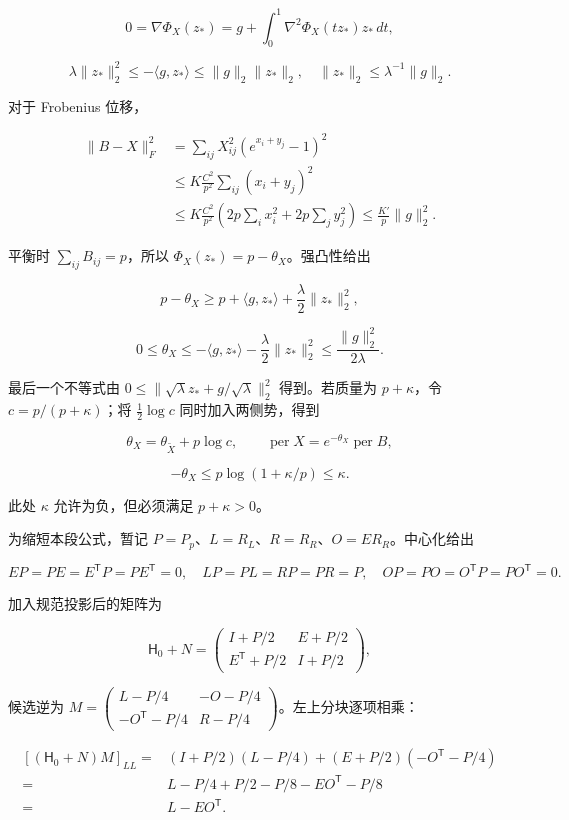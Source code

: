 \documentclass[11pt,a4paper]{article}
\begin{document}
\[
0=\nabla\Phi_X(z_*)=g+\int_0^1\nabla^2\Phi_X(tz_*)z_*\,dt,
\]

\[
\lambda\|z_*\|_2^2\le-\langle g,z_*\rangle\le\|g\|_2\|z_*\|_2,
\quad\|z_*\|_2\le\lambda^{-1}\|g\|_2.
\]

对于 Frobenius 位移，

\[
\begin{aligned}
\|B-X\|_F^2
&=\sum_{ij}X_{ij}^2(e^{x_i+y_j}-1)^2\\
&\le K\frac{C^2}{p^2}\sum_{ij}(x_i+y_j)^2\\
&\le K\frac{C^2}{p^2}\left(2p\sum_ix_i^2+2p\sum_jy_j^2\right)
\le\frac{K'}p\|g\|_2^2.
\end{aligned}
\]

平衡时 \(\sum_{ij}B_{ij}=p\)，所以 \(\Phi_X(z_*)=p-\theta_X\)。强凸性给出

\[
p-\theta_X\ge p+\langle g,z_*\rangle+\frac\lambda2\|z_*\|_2^2,
\]

\[
0\le\theta_X\le-\langle g,z_*\rangle-\frac\lambda2\|z_*\|_2^2
\le\frac{\|g\|_2^2}{2\lambda}.
\]

最后一个不等式由 \(0\le\|\sqrt\lambda z_*+g/\sqrt\lambda\|_2^2\) 得到。若质量为 \(p+\kappa\)，令 \(c=p/(p+\kappa)\)；将 \(\tfrac12\log c\) 同时加入两侧势，得到

\[
\theta_X=\theta_{\widetilde X}+p\log c,\qquad
\operatorname{per}X=e^{-\theta_X}\operatorname{per}B,
\]

\[
-\theta_X\le p\log(1+\kappa/p)\le\kappa.
\]

此处 \(\kappa\) 允许为负，但必须满足 \(p+\kappa>0\)。

为缩短本段公式，暂记 \(P=P_p\)、\(L=R_L\)、\(R=R_R\)、\(O=ER_R\)。中心化给出

\[
EP=PE=E^{\mathsf T}P=PE^{\mathsf T}=0,\quad
LP=PL=RP=PR=P,\quad OP=PO=O^{\mathsf T}P=PO^{\mathsf T}=0.
\]

加入规范投影后的矩阵为

\[
\mathsf H_0+N=\begin{pmatrix}I+P/2&E+P/2\\E^{\mathsf T}+P/2&I+P/2\end{pmatrix},
\]

候选逆为 \(M=\left(\begin{smallmatrix}L-P/4&-O-P/4\\-O^{\mathsf T}-P/4&R-P/4\end{smallmatrix}\right)\)。左上分块逐项相乘：

\[
\begin{aligned}
[(\mathsf H_0+N)M]_{LL}
={}&(I+P/2)(L-P/4)+(E+P/2)(-O^{\mathsf T}-P/4)\\
={}&L-P/4+P/2-P/8-EO^{\mathsf T}-P/8\\
={}&L-EO^{\mathsf T}.
\end{aligned}
\]
\end{document}
